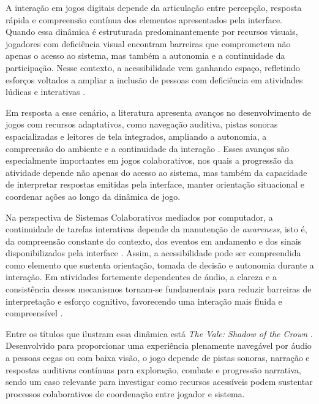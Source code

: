 \documentclass[12pt]{article}
\begin{document}
{{A interação em jogos digitais depende da articulação entre percepção, resposta rápida e compreensão contínua dos elementos apresentados pela interface. Quando essa dinâmica é estruturada predominantemente por recursos visuais, jogadores com deficiência visual encontram barreiras que comprometem não apenas o acesso ao sistema, mas também a autonomia e a continuidade da participação\cite{pereira2018game,sbgames1}. Nesse contexto, a acessibilidade vem ganhando espaço, refletindo esforços voltados a ampliar a inclusão de pessoas com deficiência em atividades lúdicas e interativas \cite{bolesnikov2022understanding,da2023avaliaccao}.

Em resposta a esse cenário, a literatura apresenta avanços no desenvolvimento de jogos com recursos adaptativos, como navegação auditiva, pistas sonoras espacializadas e leitores de tela integrados, ampliando a autonomia, a compreensão do ambiente e a continuidade da interação \cite{aguado2020accessibility}. Esses avanços são especialmente importantes em jogos colaborativos, nos quais a progressão da atividade depende não apenas do acesso ao sistema, mas também da capacidade de interpretar respostas emitidas pela interface, manter orientação situacional e coordenar ações ao longo da dinâmica de jogo.

Na perspectiva de Sistemas Colaborativos mediados por computador, a continuidade de tarefas interativas depende da manutenção de \textit{awareness}, isto é, da compreensão constante do contexto, dos eventos em andamento e dos sinais disponibilizados pela interface \cite{10.1023/A:1021271517844}. Assim, a acessibilidade pode ser compreendida como elemento que sustenta orientação, tomada de decisão e autonomia durante a interação\cite{belli2019acessibilidade,de2021acessibilidade}. Em atividades fortemente dependentes de áudio, a clareza e a consistência desses mecanismos tornam-se fundamentais para reduzir barreiras de interpretação e esforço cognitivo, favorecendo uma interação mais fluida e compreensível \cite{holloway2019disability}.

Entre os títulos que ilustram essa dinâmica está \textit{The Vale: Shadow of the Crown} \cite{TheVale2021}. Desenvolvido para proporcionar uma experiência plenamente navegável por áudio a pessoas cegas ou com baixa visão, o jogo depende de pistas sonoras, narração e respostas auditivas contínuas para exploração, combate e progressão narrativa, sendo um caso relevante para investigar como recursos acessíveis podem sustentar processos colaborativos de coordenação entre jogador e sistema.

}}
\end{document}
